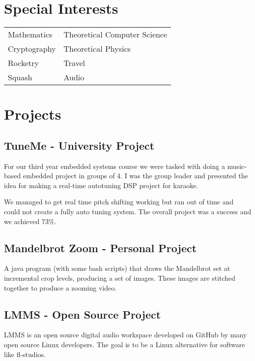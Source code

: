 \documentclass[twocolumn, 8pt]{extarticle}
\begin{document}
\section{Special Interests}
\begin{center}
\renewcommand{\arraystretch}{1.5}
\begin{tabular}{l l}
	Mathematics & Theoretical Computer Science \\
	Cryptography & Theoretical Physics \\
	Rocketry & Travel \\
	Squash & Audio \\
\end{tabular}
\end{center}

\newpage
\section{Projects}

\subsection{TuneMe - University Project}

For our third year embedded systems course we were
tasked with doing a music-based embedded project in
groups of 4. I was the group leader and presented the idea
for making a real-time autotuning DSP project for karaoke.

We managed to get real time pitch shifting working but ran
out of time and could not create a fully auto tuning system.
The overall project was a success and we achieved 73\%.

\subsection{Mandelbrot Zoom - Personal Project}

A java program (with some bash scripts) that draws the
Mandelbrot set at incremental crop levels, producing a set
of images. These images are stitched together to produce a
zooming video.

\subsection{LMMS - Open Source Project}

LMMS is an open source digital audio workspace developed
on GitHub by many open source Linux developers. The goal
is to be a Linux alternative for software like fl-studios.
\end{document}
